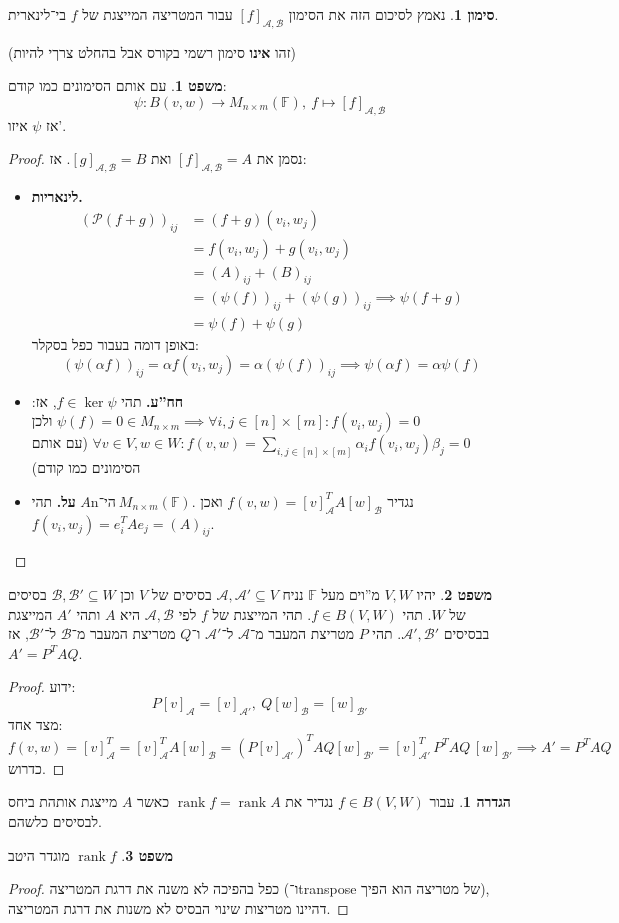 \documentclass[a4paper]{article}
\newcommand\ps    {\mathcal{P}}
\newcommand\ac    {\mathcal{A}}
\newcommand\bc    {\mathcal{B}}
\newcommand\n     {$n$־יה\ }
\DeclareMathOperator{\rk}      {rank}
\newcommand\F         {\mathbb{F}}
\newcommand\co        {\colon}
\newcommand\ag        {\alpha}
\newcommand\bg        {\beta}
\theoremstyle{definition}
\newtheorem{Theorem}{משפט}
\newtheorem{definition}{הגדרה}
\newtheorem{Notion}{סימון}
\newcommand\theo  [1] {\begin{Theorem}#1\end{Theorem}}
\newcommand\defi  [1] {\begin{definition}#1\end{definition}}
\newcommand\noti  [1] {\begin{Notion}#1\end{Notion}}
\begin{document}
	
	\noti{נאמץ לסיכום הזה את הסימון $[f]_{\ac, \bc}$ עבור המטריצה המייצגת של $f$ בי־לינארית. }
	(זהו \textbf{אינו} סימון רשמי בקורס אבל בהחלט צרךי להיות)
	\theo{עם אותם הסימונים כמו קודם: 
		\[ \psi \co B(v, w) \to M_{n \times m}(\F), \ f \mapsto [f]_{\ac, \bc} \]
		אז $\psi$ איזו'. }
	\begin{proof}
		נסמן את $[f]_{\ac, \bc} = A$ ואת $[g]_{\ac, \bc} = B$. אז: 
		\begin{itemize}
			\item \textbf{לינאריות. }
			\begin{align*}
				(\ps(f + g))_{ij} &= (f + g)(v_i, w_j) \\
				&= f(v_i, w_j) + g(v_i, w_j) \\
				&= (A)_{ij} + (B)_{ij} \\
				&= (\psi(f))_{ij} + (\psi(g))_{ij} \implies \psi(f + g) \\
				&= \psi(f) + \psi(g)
			\end{align*}
			באופן דומה בעבור כפל בסקלר: 
			\[ (\psi(\ag f))_{ij} = \ag f(v_i, w_j) = \ag (\psi(f))_{ij} \implies \psi(\ag f) = \ag \psi(f) \]
			\item \textbf{חח''ע. }תהי $f \in \ker \psi$, אז: $\psi(f) = 0 \in M_{n \times m} \implies \forall i,j \in [n] \times [m]\co f(v_i, w_j) = 0$ ולכן $\forall v \in V, w \in W \co f(v, w) = \sum_{{i, j \in [n] \times [m]}}\ag_i f(v_i, w_j)\bg_j = 0$
			(עם אותם הסימונים כמו קודם)
			\item \textbf{על. }תהי $A \n M_{n \times m}(\F)$. נגדיר $f(v, w) = [v]_\ac^T A[w]_\bc$ ואכן $f(v_i, w_j) = e_i^T A e_j = (A)_{ij}$. 
		\end{itemize}
	\end{proof}
	
	\theo{יהיו $V, W$ מ''וים מעל $\F$ נניח $\ac, \ac' \subseteq V$ בסיסים של $V$ וכן $\bc, \bc' \subseteq W$ בסיסים של $W$. תהי $f \in B(V, W)$. 
		תהי המייצגת של $f$ לפי $\ac, \bc$ היא $A$ ותהי $A'$ המייצגת בבסיסים $\ac', \bc'$. תהי $P$ מטריצת המעבר מ־$\ac$ ל־$\ac'$ ו־$Q$ מטריצת המעבר מ־$\bc$ ל־$\bc'$, אז $A' = P^T AQ$. 
	}
	\begin{proof}
		ידוע: 
		\[ P[v]_{\ac} = [v]_{\ac'}, \ Q[w]_\bc = [w]_{\bc'} \]
		מצד אחד: 
		\[ f(v, w) = [v]_\ac^T = [v]_{\ac}^T A [w]_\bc = (P[v]_{\ac '})^TAQ[w]_{\bc'} = [v]_{\ac'}^T \, P^T A Q \, [w]_{\bc'} \implies A' = P^T A Q \]
		כדרוש. 
	\end{proof}
	
	\defi{עבור $f \in B(V, W)$ נגדיר את $\rk f = \rk A$ כאשר $A$ מייצגת אותהת ביחס לבסיסים כלשהם. }
	\theo{$\rk f$ מוגדר היטב}
	\begin{proof}
		כפל בהפיכה לא משנה את דרגת המטריצה (ו־transpose של מטריצה הוא הפיך), דהיינו מטריצות שינוי הבסיס לא משנות את דרגת המטריצה. 
	\end{proof}
	
\end{document}
